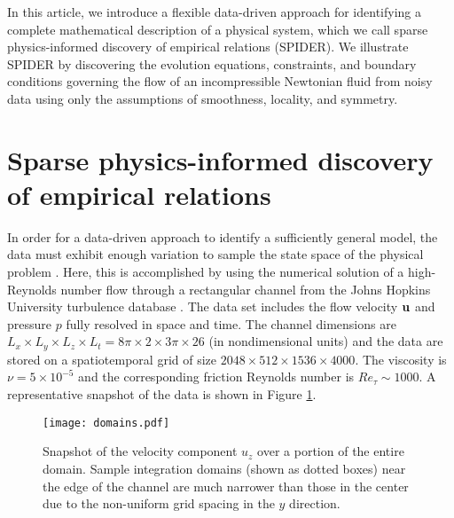 \documentclass[
 reprint,
 amsmath,amssymb,
 aps,
]{revtex4-2}
\begin{document}
In this article, we introduce a flexible data-driven approach for identifying a complete mathematical description of a physical system, which we call sparse physics-informed discovery of empirical relations (SPIDER). We illustrate SPIDER by discovering the evolution equations, constraints, and boundary conditions governing the flow of an incompressible Newtonian fluid from noisy data using only the assumptions of smoothness, locality, and symmetry. 

\section*{Sparse physics-informed discovery of empirical relations}

In order for a data-driven approach to identify a sufficiently general model, the data must exhibit enough variation to sample the state space of the physical problem \cite{schaeffer2018}. Here, this is accomplished by using the numerical solution of a high-Reynolds number flow through a rectangular channel from the Johns Hopkins University turbulence database \cite{jhutdb}. The data set includes the flow velocity ${\bf u}$ and pressure $p$ fully resolved in space and time. The channel dimensions are $L_x\times L_y\times L_z\times L_t=8\pi\times 2\times 3\pi\times 26$ (in nondimensional units) and the data are stored on a spatiotemporal grid of size $2048\times 512\times 1536\times 4000$. The viscosity is $\nu=5\times 10^{-5}$ and the corresponding friction Reynolds number is $Re_\tau \sim 1000$. A representative snapshot of the data is shown in Figure \ref{fig:domains}.

\begin{figure}[t]
\centering
\texttt{[image: domains.pdf]}
\caption{Snapshot of the velocity component $u_z$ over a portion of the entire domain. Sample integration domains (shown as dotted boxes) near the edge of the channel are much narrower than those in the center due to the non-uniform grid spacing in the $y$ direction.
}
\label{fig:domains}
\end{figure}
\end{document}
